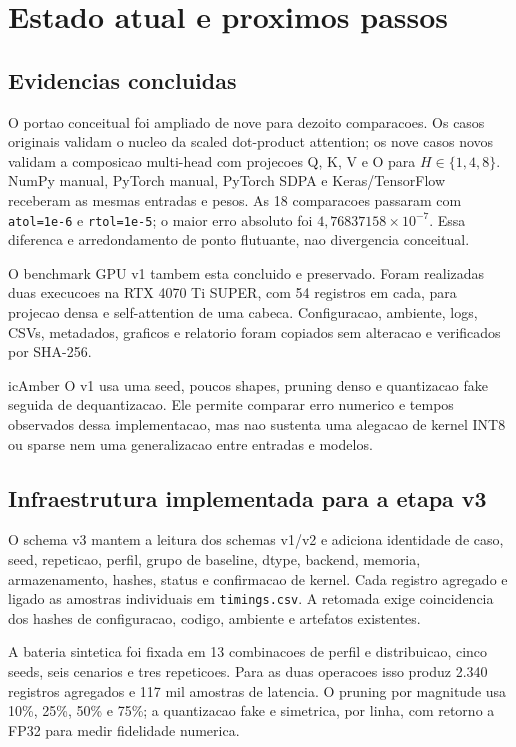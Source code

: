 \chapter{Estado atual e proximos passos}

\section{Evidencias concluidas}

O portao conceitual foi ampliado de nove para dezoito comparacoes. Os casos
originais validam o nucleo da scaled dot-product attention; os nove casos novos
validam a composicao multi-head com projecoes Q, K, V e O para
$H\in\{1,4,8\}$. NumPy manual, PyTorch manual, PyTorch SDPA e Keras/TensorFlow
receberam as mesmas entradas e pesos. As 18 comparacoes passaram com
\texttt{atol=1e-6} e \texttt{rtol=1e-5}; o maior erro absoluto foi
$4{,}76837158\times10^{-7}$. Essa diferenca e arredondamento de ponto flutuante,
nao divergencia conceitual.

O benchmark GPU v1 tambem esta concluido e preservado. Foram realizadas duas
execucoes na RTX 4070 Ti SUPER, com 54 registros em cada, para projecao densa e
self-attention de uma cabeca. Configuracao, ambiente, logs, CSVs, metadados,
graficos e relatorio foram copiados sem alteracao e verificados por SHA-256.

\begin{icstatus}{icAmber}
O v1 usa uma seed, poucos shapes, pruning denso e quantizacao fake seguida de
dequantizacao. Ele permite comparar erro numerico e tempos observados dessa
implementacao, mas nao sustenta uma alegacao de kernel INT8 ou sparse nem uma
generalizacao entre entradas e modelos.
\end{icstatus}

\section{Infraestrutura implementada para a etapa v3}

O schema v3 mantem a leitura dos schemas v1/v2 e adiciona identidade de caso,
seed, repeticao, perfil, grupo de baseline, dtype, backend, memoria,
armazenamento, hashes, status e confirmacao de kernel. Cada registro agregado e
ligado as amostras individuais em \texttt{timings.csv}. A retomada exige
coincidencia dos hashes de configuracao, codigo, ambiente e artefatos existentes.

A bateria sintetica foi fixada em 13 combinacoes de perfil e distribuicao, cinco
seeds, seis cenarios e tres repeticoes. Para as duas operacoes isso produz 2.340
registros agregados e 117 mil amostras de latencia. O pruning por magnitude usa
10\%, 25\%, 50\% e 75\%; a quantizacao fake e simetrica, por linha, com retorno
a FP32 para medir fidelidade numerica.

